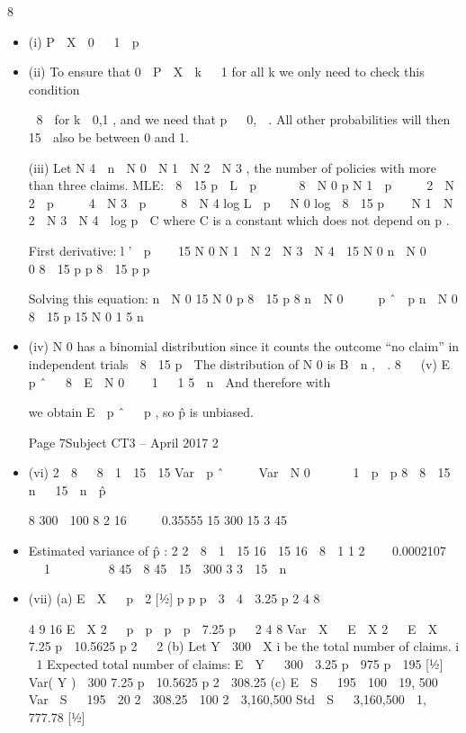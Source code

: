 \documentclass[a4paper,12pt]{article}
\begin{document}
\begin{enumerate}
8
\begin{itemize}
\item (i) P  X  0   1  p 
\item (ii) To ensure that 0  P  X  k   1 for all k we only need to check this condition

 8 
for k  0,1 , and we need that p   0,  . All other probabilities will then
 15 
also be between 0 and 1.

(iii)
Let N 4  n  N 0  N 1  N 2  N 3 , the number of policies with more than
three claims.
MLE:
 8  15 p 
L  p   

 8 
N 0
p
N 1 
p 
 
 2 
N 2
 p 
 
 4 
N 3
 p 
 
 8 
N 4
log L  p   N 0 log  8  15 p    N 1  N 2  N 3  N 4  log p  C
where C is a constant which does not depend on p .

First derivative:
l '  p  
 15 N 0 N 1  N 2  N 3  N 4  15 N 0 n  N 0



 0
8  15 p
p
8  15 p
p

Solving this equation:
n  N 0
15 N 0
p
8  15 p
8 n  N 0



 p ˆ 
p
n  N 0
8  15 p
15 N 0
1 5 n
\item (iv)
N 0 has a binomial distribution since it counts the outcome “no claim” in
independent trials
 8  15 p 
The distribution of N 0 is B  n ,
 .
8 

(v)
E  p ˆ  
8  E  N 0  
 1 

1 5 
n 
And therefore with




we obtain E  p ˆ   p , so p̂ is unbiased.

Page 7Subject CT3  – April 2017 
2
\item (vi)
2
 8 
 8  1  15  15
Var  p ˆ   
 Var  N 0      1  p  p
8  8
 15 n 
 15  n 
p̂ 

8 300  100 8 2 16
  
 0.35555
15 300
15 3 45
\item 
Estimated variance of p̂ :
2
2
 8  1  15 16  15 16  8  1 1 2
   0.0002107
   1       
8 45  8 45  15  300 3 3
 15  n 
\item (vii)
(a)
E  X   p  2
[1⁄2]
p
p
p
 3  4  3.25 p
2
4
8

4
9
16
E  X 2   p  p  p  p  7.25 p
 
2
4
8 
Var  X   E  X 2   E  X   7.25 p  10.5625 p 2
  
2
(b)
Let Y 
300
 X i be the total number of claims.
i  1
Expected total number of claims: E  Y   300  3.25 p  975 p  195
[1⁄2]


Var( Y )  300 7.25 p  10.5625 p 2  308.25
(c)
E  S   195  100  19, 500
Var  S   195  20 2  308.25  100 2  3,160,500
Std  S   3,160,500  1, 777.78
[1⁄2]


\end{itemize}
\end{enumerate}
\end{document}
